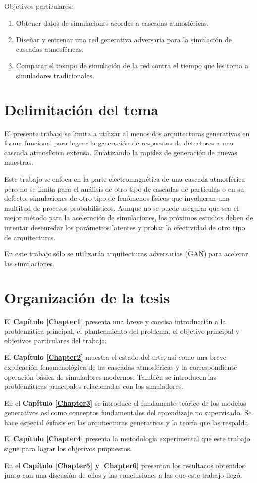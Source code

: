 Objetivos particulares:
\renewcommand{\theenumi}{\roman{enumi}}%
\begin{enumerate}
   \item Obtener datos de simulaciones acordes a cascadas atmosféricas.
   \item Diseñar y entrenar una red generativa adversaria para la simulación de cascadas atmosféricas.
   \item Comparar el tiempo de simulación de la red contra el tiempo que les toma a simuladores tradicionales.
\end{enumerate}

\section{Delimitación del tema}

El presente trabajo se limita a utilizar al menos dos arquitecturas generativas en forma funcional para lograr la generación de respuestas de detectores a una cascada atmosférica extensa. Enfatizando la rapidez de generación de nuevas muestras. 

Este trabajo se enfoca en la parte electromagnética de una cascada atmosférica pero no se limita para el análisis de otro tipo de cascadas de partículas o en su defecto, simulaciones de otro tipo de fenómenos físicos que involucran una multitud de procesos probabilísticos. Aunque no se puede asegurar que sea el mejor método para la aceleración de simulaciones, los próximos estudios deben de intentar desenredar los parámetros latentes y probar la efectividad de otro tipo de arquitecturas. 

En este trabajo sólo se utilizarán arquitecturas adversarias (GAN) para acelerar las simulaciones. 

\section{Organización de la tesis}

El \textbf{Capítulo \ref{Chapter1}} presenta una breve y concisa introducción a la problemática principal, el planteamiento del problema, el objetivo principal y objetivos particulares del trabajo. %

El \textbf{Capítulo \ref{Chapter2}} muestra el estado del arte, así como una breve explicación fenomenológica de las cascadas atmosféricas y la correspondiente operación básica de simuladores modernos. También se introducen las problemáticas principales relacionadas con los simuladores.

En el \textbf{Capítulo \ref{Chapter3}} se introduce el fundamento teórico de los modelos generativos así como conceptos fundamentales del aprendizaje no supervisado. Se hace especial énfasis en las arquitecturas generativas y la teoría que las respalda.

El \textbf{Capítulo \ref{Chapter4}} presenta la metodología experimental que este trabajo sigue para lograr los objetivos propuestos. 

En el \textbf{Capítulo \ref{Chapter5} y \ref{Chapter6}} presentan los resultados obtenidos junto con una discusión de ellos y las conclusiones a las que este trabajo llegó. 